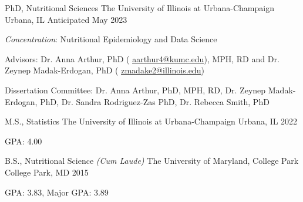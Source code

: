






\begin{cventries}

  \cventry
    {PhD, Nutritional Sciences} %
    {The University of Illinois at Urbana-Champaign} %
    {Urbana, IL} %
    {Anticipated May 2023} %
    {
      \begin{cvitems} %
        \item {\textit{Concentration}: Nutritional Epidemiology and Data Science}
         \item {Advisors: Dr. Anna Arthur, PhD ( \textcolor{navyblue}{{\underline{\href{mailto:aarthur4@kumc.edu}{aarthur4@kumc.edu}}}}), MPH, RD and Dr. Zeynep Madak-Erdogan, PhD ( \textcolor{navyblue}{\underline{\href{mailto:zmadake2@illinois.edu}{zmadake2@illinois.edu}}})}
         \item{Dissertation Committee: Dr. Anna Arthur, PhD, MPH, RD, Dr. Zeynep Madak-Erdogan, PhD, Dr. Sandra Rodriguez-Zas PhD, Dr. Rebecca Smith, PhD}
      \end{cvitems}
    }


  \cventry
    {M.S., Statistics} %
    {The University of Illinois at Urbana-Champaign} %
    {Urbana, IL} %
    {2022} %
    {
      \begin{cvitems} %
        \item {GPA: 4.00}
      \end{cvitems}
    }


  \cventry
    {B.S., Nutritional Science \textit{(Cum Laude)}} %
    {The University of Maryland, College Park} %
    {College Park, MD} %
    {2015} %
    {
      \begin{cvitems} %
        \item {GPA: 3.83, Major GPA: 3.89}
      \end{cvitems}
    }

\end{cventries}
